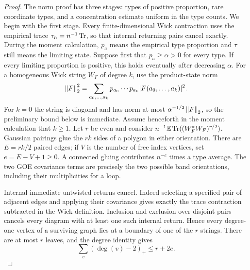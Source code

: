 \begin{proof}
The norm proof has three stages: types of positive proportion, rare
coordinate types, and a concentration estimate uniform in the type
counts.  We begin with the first stage.  Every finite-dimensional Wick
contraction uses the empirical trace $\tau_n=n^{-1}\operatorname{Tr}$, so that
internal returning pairs cancel exactly.  During the moment calculation,
$p_a$ means the empirical type proportion and $\tau$ still means
the limiting state.  Suppose first that $p_a\ge\alpha>0$ for every
type.  If every limiting proportion is positive, this holds eventually
after decreasing $\alpha$.  For a homogeneous Wick string $W_F$ of
degree $k$, use the product-state norm
\[
 \left\lVert F\right\rVert_2^2=\sum_{a_0,\ldots,a_k}
             p_{a_0}\cdots p_{a_k}|F(a_0,\ldots,a_k)|^2.
\]
For $k=0$ the string is diagonal and has norm at most
$\alpha^{-1/2}\left\lVert F\right\rVert_2$, so the preliminary bound below is
immediate.  Assume henceforth in the moment calculation that $k\ge1$.
Let $r$ be even and consider
$n^{-1}\mathbb E\operatorname{Tr}((W_F^*W_F)^{r/2})$.  Gaussian pairings glue the $rk$
sides of a polygon in either orientation.  There are $E=rk/2$
paired edges; if $V$ is the number of free index vertices, set
$e=E-V+1\ge0$.  A connected gluing contributes $n^{-e}$ times a
type average.  The two GOE covariance terms are precisely the two
possible band orientations, including their multiplicities for a loop.

Internal immediate untwisted returns cancel.  Indeed selecting a
specified pair of adjacent edges and applying their covariance gives
exactly the trace contraction subtracted in the Wick definition.
Inclusion and exclusion over disjoint pairs cancels every diagram with
at least one such internal return.  Hence every degree-one vertex of a
surviving graph lies at a boundary of one of the $r$ strings.  There are
at most $r$ leaves, and the degree identity gives
\begin{equation}
 \sum_v(\deg(v)-2)_+\le r+2e.
 \label{eq:path-map-degree}
\end{equation}


\end{proof}
